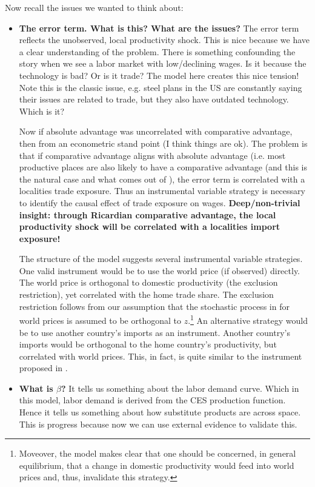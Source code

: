 \documentclass[pdftex,12pt]{article}
\begin{document}
\medskip
\noindent Now recall the issues we wanted to think about:
\begin{itemize}
\item \textbf{The error term. What is this? What are the issues?} The error term reflects the unobserved, local productivity shock. This is nice because we have a clear understanding of the problem. There is something confounding the story when we see a labor market with low/declining wages. Is it because the technology is bad? Or is it trade? The model here creates this nice tension! Note this is the classic issue, e.g. steel plans in the US are constantly saying their issues are related to trade, but they also have outdated technology. Which is it?

    Now if absolute advantage was uncorrelated with comparative advantage, then from an econometric stand point (I think things are ok). The problem is that if comparative advantage aligns with absolute advantage (i.e. most productive places are also likely to have a comparative advantage (and this is the natural case and what comes out of \citet{eaton2002technology}), the error term is correlated with a localities trade exposure.  Thus an instrumental variable strategy is necessary to identify the causal effect of trade exposure on wages. \textbf{Deep/non-trivial insight: through Ricardian comparative advantage, the local productivity shock will be correlated with a localities import exposure!}

    The structure of the model suggests several instrumental variable strategies. One valid instrument would be to use the world price (if observed) directly. The world price is orthogonal to domestic productivity (the exclusion restriction), yet correlated with the home trade share. The exclusion restriction follows from our assumption that the stochastic process in for world prices is assumed to be orthogonal to $z$.\footnote{Moveover, the model makes clear that one should be concerned, in general equilibrium, that a change in domestic productivity would feed into world prices and, thus, invalidate this strategy.} An alternative strategy would be to use another country's imports as an instrument. Another country's imports would be orthogonal to the home country's productivity, but correlated with world prices. This, in fact, is quite similar to the instrument proposed in \citet{david2013china}.

\item \textbf{What is $\beta$?} It tells us something about the labor demand curve. Which in this model, labor demand is derived from the CES production function. Hence it tells us something about how substitute products are across space. This is progress because now we can use external evidence to validate this.


\end{itemize}
\end{document}
